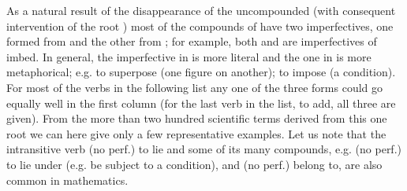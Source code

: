 As a natural result of the disappearance of the uncompounded  (with consequent intervention of the root ) most of the compounds of  have two imperfectives, one formed from  and the other from ; for example, both  and  are imperfectives of  imbed. In general, the imperfective in  is more literal and the one in  is more metaphorical; e.g.  to superpose (one figure on another);  to impose (a condition). For most of the verbs in the following list any one of the three forms could go equally well in the first column (for the last verb in the list, to add, all three are given). From the more than two hundred scientific terms derived from this one root  we can here give only a few representative examples. Let us note that the intransitive verb  (no perf.) to lie and some of its many compounds, e.g.  (no perf.) to lie under (e.g. be subject to a condition), and  (no perf.) belong to, are also common in mathematics.

